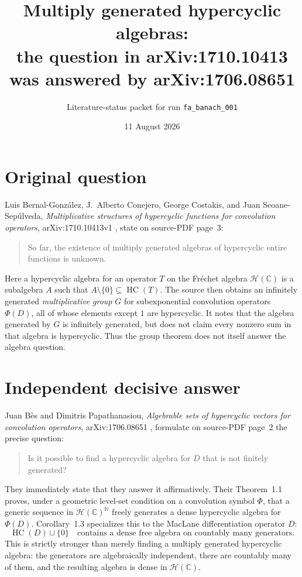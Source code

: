 \documentclass[11pt]{article}
\title{Multiply generated hypercyclic algebras:\\
the question in arXiv:1710.10413 was answered by arXiv:1706.08651}
\author{Literature-status packet for run \texttt{fa\_banach\_001}}
\date{11 August 2026}
\newcommand{\HC}{\operatorname{HC}}
\newcommand{\Hol}{\mathcal H(\mathbb C)}
\begin{document}
\maketitle

\begin{center}
\end{center}

\section*{Original question}

Luis Bernal-Gonz\'alez, J.~Alberto Conejero, George Costakis, and Juan
Seoane-Sep\'ulveda, \emph{Multiplicative structures of hypercyclic functions
for convolution operators}, arXiv:1710.10413v1 \cite{BCCS}, state on
source-PDF page~3:
\begin{quote}
So far, the existence of multiply generated algebras of hypercyclic entire
functions is unknown.
\end{quote}
Here a hypercyclic algebra for an operator $T$ on the Fr\'echet algebra
$\Hol$ is a subalgebra $A$ such that $A\setminus\{0\}\subseteq\HC(T)$.
The source then obtains an infinitely generated \emph{multiplicative group}
$G$ for subexponential convolution operators $\Phi(D)$, all of whose elements
except $1$ are hypercyclic.  It notes that the algebra generated by $G$ is
infinitely generated, but does not claim every nonzero sum in that algebra is
hypercyclic.  Thus the group theorem does not itself answer the algebra
question.

\section*{Independent decisive answer}

Juan B\`es and Dimitris Papathanasiou, \emph{Algebrable sets of hypercyclic
vectors for convolution operators}, arXiv:1706.08651 \cite{BP}, formulate on
source-PDF page~2 the precise question:
\begin{quote}
Is it possible to find a hypercyclic algebra for $D$ that is not finitely
generated?
\end{quote}
They immediately state that they answer it affirmatively.  Their
Theorem~1.1 proves, under a geometric level-set condition on a convolution
symbol $\Phi$, that a generic sequence in $\Hol^{\mathbb N}$ freely generates
a dense hypercyclic algebra for $\Phi(D)$.  Corollary~1.3 specializes this to
the MacLane differentiation operator $D$:
\[
  \HC(D)\cup\{0\}\quad\text{contains a dense free algebra on countably many
  generators.}
\]
This is strictly stronger than merely finding a multiply generated
hypercyclic algebra: the generators are algebraically independent, there are
countably many of them, and the resulting algebra is dense in $\Hol$.
\end{document}
